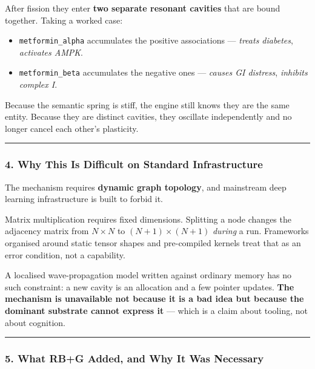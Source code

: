 \documentclass[
  11pt,
  a4paper,
]{article}
\providecommand{\tightlist}{%
  \setlength{\itemsep}{0pt}\setlength{\parskip}{0pt}}
\begin{document}
After fission they enter \textbf{two separate resonant cavities} that
are bound together. Taking a worked case:

\begin{itemize}
\tightlist
\item
  \texttt{metformin\_alpha} accumulates the positive associations ---
  \emph{treats diabetes}, \emph{activates AMPK}.
\item
  \texttt{metformin\_beta} accumulates the negative ones ---
  \emph{causes GI distress}, \emph{inhibits complex I}.
\end{itemize}

Because the semantic spring is stiff, the engine still knows they are
the same entity. Because they are distinct cavities, they oscillate
independently and no longer cancel each other's plasticity.

\begin{center}\rule{0.5\linewidth}{0.5pt}\end{center}

\subsubsection{4. Why This Is Difficult on Standard
Infrastructure}\label{why-this-is-difficult-on-standard-infrastructure}

The mechanism requires \textbf{dynamic graph topology}, and mainstream
deep learning infrastructure is built to forbid it.

Matrix multiplication requires fixed dimensions. Splitting a node
changes the adjacency matrix from \(N \times N\) to
\((N{+}1) \times (N{+}1)\) \emph{during} a run. Frameworks organised
around static tensor shapes and pre-compiled kernels treat that as an
error condition, not a capability.

A localised wave-propagation model written against ordinary memory has
no such constraint: a new cavity is an allocation and a few pointer
updates. \textbf{The mechanism is unavailable not because it is a bad
idea but because the dominant substrate cannot express it} --- which is
a claim about tooling, not about cognition.

\begin{center}\rule{0.5\linewidth}{0.5pt}\end{center}

\subsubsection{5. What RB+G Added, and Why It Was
Necessary}\label{what-rbg-added-and-why-it-was-necessary}
\end{document}
